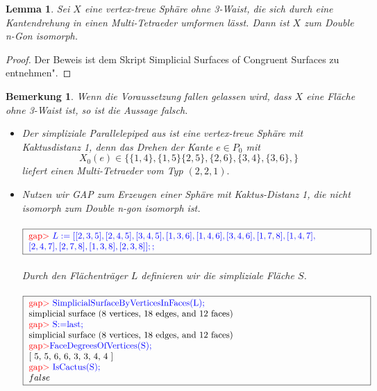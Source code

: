 \documentclass[12pt,titlepage,twoside,cleardoublepage]{article}
\theoremstyle{nummermitklammern}
\newtheorem{lemma}[temp]{Lemma}
\newtheorem{bemerkung}[temp]{Bemerkung}
\newtheorem{lemma}[zahl]{Lemma}
\newtheorem{bemerkung}[zahl]{Bemerkung}
\numberwithin{equation}{section}
\begin{document}
\begin{lemma}
Sei $X$ eine vertex-treue Sphäre ohne 3-Waist, die  sich durch eine Kantendrehung in einen Multi-Tetraeder umformen lässt. Dann ist $X$  zum Double n-Gon isomorph.
\end{lemma} 
\begin{proof}
Der Beweis ist dem Skript  Simplicial Surfaces of Congruent Surfaces zu entnehmen".
\end{proof}
\begin{bemerkung}
Wenn die Voraussetzung fallen gelassen wird, dass $X$ eine Fläche ohne 3-Waist ist, so ist die Aussage falsch. 
\begin{itemize}
\item Der simpliziale Parallelepiped aus  ist eine vertex-treue Sphäre mit Kaktusdistanz 1, denn das Drehen der Kante $e\in P_0$ mit 
\[
X_0(e)\in\{\{1,4\},\{1,5\}\{2,5\},\{2,6\},\{3,4\},\{3,6\},\}
\] liefert einen Multi-Tetraeder vom Typ $(2,2,1).$
\item Nutzen wir GAP zum Erzeugen einer Sphäre mit Kaktus-Distanz 1, die nicht isomorph zum Double n-gon isomorph ist. \\\\
$\fbox{
\parbox{13.4cm}{
\textcolor{red}{gap$>$} \textcolor{blue}{$L:=[[ 2, 3, 5 ], [ 2, 4, 5 ], [ 3, 4, 5 ], [ 1, 3, 6 ], [ 1, 4, 6 ], 
  [ 3, 4, 6 ], [ 1, 7, 8 ], [ 1, 4, 7 ],\newline [ 2, 4, 7 ], [ 2, 7, 8 ], [ 1, 3, 8 ], [ 2, 3, 8 ] ];;$}
  }}$\\\\
  Durch den Flächenträger $L$ definieren wir die simpliziale Fläche $S$.\\\\
  $\fbox{
\parbox{13.4cm}{
\textcolor{red}{gap$>$} \textcolor{blue}{SimplicialSurfaceByVerticesInFaces(L);}\newline
simplicial surface (8 vertices, 18 edges, and 12 faces)\newline
\textcolor{red}{gap$>$} \textcolor{blue}{S:=last;}\newline
simplicial surface (8 vertices, 18 edges, and 12 faces)\newline
\textcolor{red}{gap$>$}\textcolor{blue}{ FaceDegreesOfVertices(S);}\newline
[ 5, 5, 6, 6, 3, 3, 4, 4 ]\newline
\textcolor{red}{gap$>$} \textcolor{blue}{IsCactus(S);}\newline
$false$
}}$\\\\

\end{itemize}
\end{bemerkung}
\end{document}
